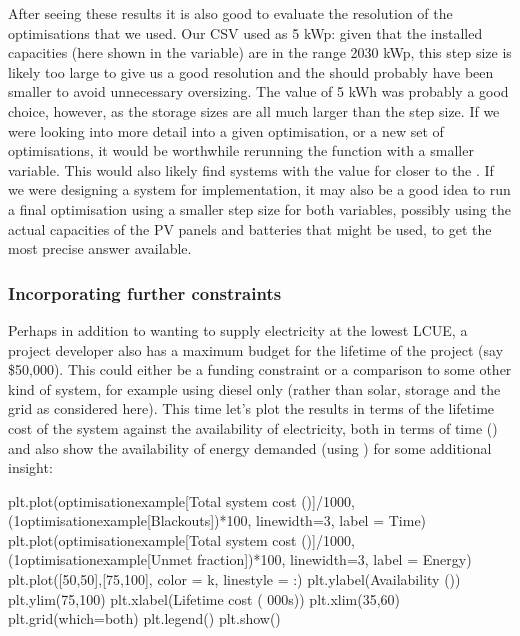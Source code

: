 \documentclass[letterpaper,10pt,english]{sphinxmanual}
\begin{document}
\sphinxAtStartPar
After seeing these results it is also good to evaluate the resolution of
the optimisations that we used. Our  CSV used
 as 5 kWp: given that the installed capacities (here
shown in the  variable) are in the range 20\sphinxhyphen{}30 kWp,
this step size is likely too large to give us a good resolution and the
should probably have been smaller to avoid unnecessary oversizing. The
 value of 5 kWh was probably a good choice,
however, as the storage sizes are all much larger than the step size. If
we were looking into more detail into a given optimisation, or a new set
of optimisations, it would be worthwhile re\sphinxhyphen{}running the function with a
smaller  variable. This would also likely find systems
with the value for  closer to the . If
we were designing a system for implementation, it may also be a good
idea to run a final optimisation using a smaller step size for both
variables, possibly using the actual capacities of the PV panels and
batteries that might be used, to get the most precise answer available.


\subsubsection{Incorporating further constraints}
\label{\detokenize{optimisation:incorporating-further-constraints}}
\sphinxAtStartPar
Perhaps in addition to wanting to supply electricity at the lowest LCUE,
a project developer also has a maximum budget for the lifetime of the
project (say \$50,000). This could either be a funding constraint or a
comparison to some other kind of system, for example using diesel only
(rather than solar, storage and the grid as considered here). This time
let’s plot the results in terms of the lifetime cost of the system
against the availability of electricity, both in terms of time
() and also show the availability of energy demanded (using
) for some additional insight:

\begin{sphinxVerbatim}[commandchars=\\\{\}]
plt.plot(optimisation\PYGZus{}example[\PYGZsq{}Total system cost (\PYGZdl{})\PYGZsq{}]/1000,
         (1\PYGZhy{}optimisation\PYGZus{}example[\PYGZsq{}Blackouts\PYGZsq{}])*100,
        linewidth=3, label = \PYGZsq{}Time\PYGZsq{})
plt.plot(optimisation\PYGZus{}example[\PYGZsq{}Total system cost (\PYGZdl{})\PYGZsq{}]/1000,
         (1\PYGZhy{}optimisation\PYGZus{}example[\PYGZsq{}Unmet fraction\PYGZsq{}])*100,
        linewidth=3, label = \PYGZsq{}Energy\PYGZsq{})
plt.plot([50,50],[75,100], color = \PYGZsq{}k\PYGZsq{}, linestyle = \PYGZsq{}:\PYGZsq{})
plt.ylabel(\PYGZsq{}Availability (\PYGZpc{})\PYGZsq{})
plt.ylim(75,100)
plt.xlabel(\PYGZsq{}Lifetime cost (\PYGZdl{} 000s)\PYGZsq{})
plt.xlim(35,60)
plt.grid(which=\PYGZsq{}both\PYGZsq{})
plt.legend()
plt.show()
\end{sphinxVerbatim}
\end{document}
